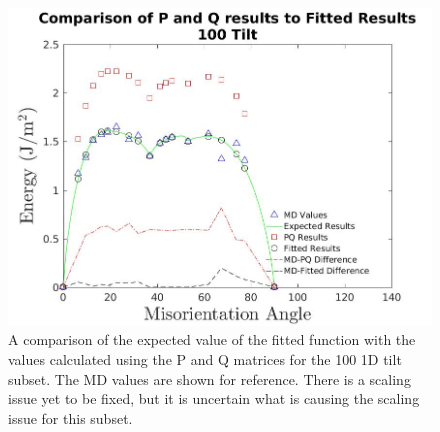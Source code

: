 \documentclass[12pt]{report}
\begin{document}
\begin{figure}[ht!]
 \centering
 \includegraphics[scale=0.26]{Images/100TiltPQvsMD}
 \caption{\label{fig:100PQ} A comparison of the expected value of the fitted function with the values calculated using the P and Q matrices for the \textlangle{}100\textrangle{} 1D tilt subset.  The MD values are shown for reference.  There is a scaling issue yet to be fixed, but it is uncertain what is causing the scaling issue for this subset.}
\end{figure}
\end{document}
